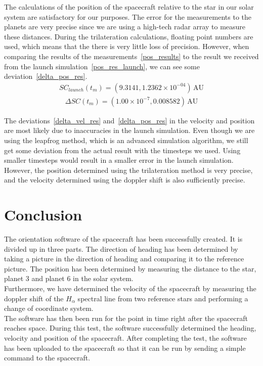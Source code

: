 \documentclass[reprint,english,notitlepage]{revtex4-2}
\begin{document}
The calculations of the position of the spacecraft relative to the star in our solar system are satisfactory for our purposes.
The error for the measurements to the planets are very precise since we are using a high-tech radar array to measure these distances.
During the trilateration calculations, floating point numbers are used, which means that the there is very little loss of precision.
However, when comparing the results of the measurements~\eqref{pos_results} to the result we received from the launch simulation~\eqref{pos_res_launch}, we can see some deviation~\eqref{delta_pos_res}.
\begin{align}
SC_{launch}(t_m) = (9.3141, 1.2362 \times 10^{-04}) \,\text{AU} \label{pos_res_launch}
\end{align}
\begin{align}
\Delta SC(t_m) = (1.00 \times 10^{-7}, 0.008582) \,\text{AU} \label{delta_pos_res}
\end{align}

The deviations~\eqref{delta_vel_res} and~\eqref{delta_pos_res} in the velocity and position are most likely due to inaccuracies in the launch simulation.
Even though we are using the leapfrog method, which is an advanced simulation algorithm, we still get some deviation from the actual result with the timesteps we used.
Using smaller timesteps would result in a smaller error in the launch simulation.
However, the position determined using the trilateration method is very precise, and the velocity determined using the doppler shift is also sufficiently precise.


\section{Conclusion} \label{sec:conclusion}
The orientation software of the spacecraft has been successfully created.
It is divided up in three parts.
The direction of heading has been determined by taking a picture in the direction of heading and comparing it to the reference picture.
The position has been determined by measuring the distance to the star, planet 3 and planet 6 in the solar system.\\
Furthermore, we have determined the velocity of the spacecraft by measuring the doppler shift of the $H_{\alpha}$ spectral line from two reference stars and performing a change of coordinate system.\\
The software has then been run for the point in time right after the spacecraft reaches space.
During this test, the software successfully determined the heading, velocity and position of the spacecraft.
After completing the test, the software has been uploaded to the spacecraft so that it can be run by sending a simple command to the spacecraft.
\end{document}
